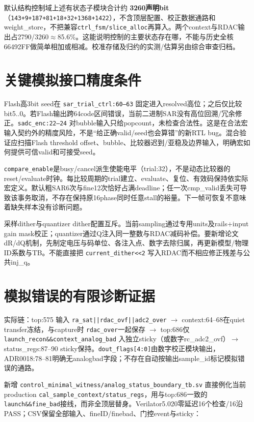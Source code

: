 \documentclass[UTF8,fontset=fandol,10pt,a4paper,openany]{ctexrep}
\newcommand{\code}[1]{\nolinkurl{#1}}
\begin{document}
默认结构控制域上述有状态子模块合计约 \textbf{3260声明bit}（\code{143+9+187+81+18+32+1368+1422}），不含顶层配置、校正数据通路和weight\_store，不把兼容\code{ctrl_fsm/slice_alloc}再算入。两个context与RDAC输出占2790/3260\ensuremath{\approx}85.6\%。这能说明控制的主要状态存在哪，不能与历史全核66492FF做简单相加或相减。校准存储及归约的实测/估算另由综合审查归档。


\section{关键模拟接口精度条件}


Flash高3bit seed在 \code{sar_trial_ctrl:60–63} 固定进入resolved高位；之后仅比较bit5..0。若Flash输出跨64code区间错误，当前二进制SAR没有高位回溯/冗余修正。\code{sadc_enc:22–24} 对bubble输入只给popcount，未检查合法性。这是在合法宏输入契约外的精度风险，不是“给正确valid/seed也会算错”的新RTL bug。混合验证应扫描Flash threshold offset、bubble、比较器迟到/亚稳及边界输入，明确宏如何提供可信valid和可接受seed。


\code{compare_enable}是busy/cancel派生使能电平（trial:32），不是动态比较器的reset/evaluate时钟。每比较周期的trial建立、evaluate、复位、有效码保持依实际宏定义。默认粗SAR6次与fine12次恰好占满deadline；任一次cmp\_valid丢失可导致该事务取消，不存在保持原16phase同时任意stall的裕量。下一帧可恢复不意味着缺失样本没有诊断问题。


采样dither与quantizer dither配置互斥。当前sampling通过专用units及rails+input gain mask校正；quantizer通过Q注入同一整数与RDAC减码补偿。要新增论文dR/dQ机制，先制定电压与码单位、各注入点、数字去除归属，再更新模型/物理ID系数与TB。不能直接把 \code{current_dither<<2} 写入RDAC而不相应修正残差与公共inj\_q。


\section{模拟错误的有限诊断证据}


实际链：top:575 输入 \code{ra_sat||rdac_ovf||adc2_over} \ensuremath{\rightarrow} context:64–68在quiet transfer冻结，与capture时 \code{rdac_over}一起保存 \ensuremath{\rightarrow} top:686仅 \code{launch_recon&&context_analog_bad} 入独立sticky（或数字rc\_adc2\_ovf）\ensuremath{\rightarrow} status\_regs:87–90 sticky保持。\code{dout_flags[4:0]}由数字校正模块输出，ADR0018:78–81明确无analogbad字段；不存在自动按输出sample\_id标记模拟错误的通路。


新增 \code{control_minimal_witness/analog_status_boundary_tb.sv} 直接例化当前production \code{cal_sample_context/status_regs}，用与top:686一致的 \code{launch&&fine_bad}接线，而非全顶层替身。Verilator5.020零延迟16个检查/16沿PASS；CSV保留全部输入、fineID/finebad、门控event与sticky：
\end{document}
